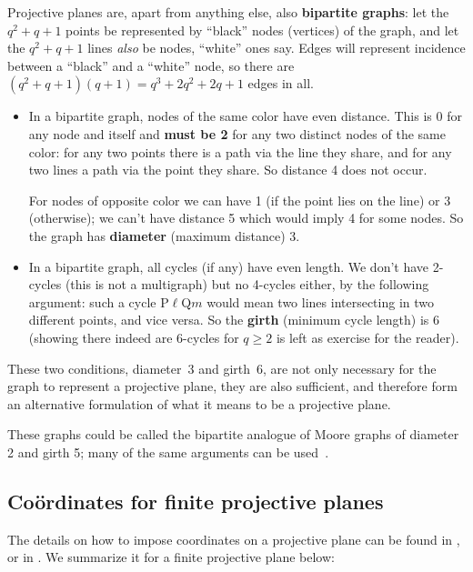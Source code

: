\documentclass[12pt]{article}
\let\uml\"              %
\let\ge\geqslant
\begin{document}
Projective planes are, apart from anything else, also {\bf bipartite graphs}: let the
$q^2+q+1$ {\sc point}s be represented by ``black'' nodes (vertices) of the graph,
and let the $q^2+q+1$ {\sc line}s {\em also\/} be nodes, ``white'' ones say.
Edges will represent incidence between a ``black'' and a ``white'' node,
so there are $(q^2+q+1)(q+1)=q^3+2q^2+2q+1$ edges in all.
%
\begin{itemize}

\item In a bipartite graph, nodes of the same color have even distance.
      This is 0 for any node and itself and {\bf must be 2} for any two
      distinct nodes of the same color: for any two {\sc point}s there is a path
      via the {\sc line} they share, and for any two {\sc line}s a path via the {\sc point}
      they share. So distance 4 does not occur.

      For nodes of opposite color we can have 1 (if the {\sc point} lies on the
      {\sc line}) or 3 (otherwise); we can't have distance 5 which would imply
      4 for some nodes. So the graph has {\bf diameter} (maximum distance) 3.

\item In a bipartite graph, all cycles (if any) have even length. We
      don't have 2-cycles (this is not a multigraph) but no 4-cycles
      either, by the following argument: such a cycle P$\ell$Q$m$
      would mean two {\sc line}s intersecting in two different {\sc point}s, and
      vice versa. So the {\bf girth} (minimum cycle length) is 6
      (showing there indeed are 6-cycles for $q\ge2$ is left as
      exercise for the reader).

\end{itemize}
%
These two conditions, diameter~3 and girth~6, are not only necessary for
the graph to represent a projective plane, they are also sufficient, and therefore form
an alternative formulation of what it means to be a projective plane.

These graphs could be called the bipartite analogue of Moore graphs of
diameter 2 and girth 5; many of the same arguments can be used~\cite{vG03}.

\clearpage
\subsection*{Co\uml{o}rdinates for finite projective planes}

The details on how to impose coordinates on a projective plane can be found in \cite{Hal59,dRe96}, or in .  We summarize it for a finite projective plane below:
\end{document}

